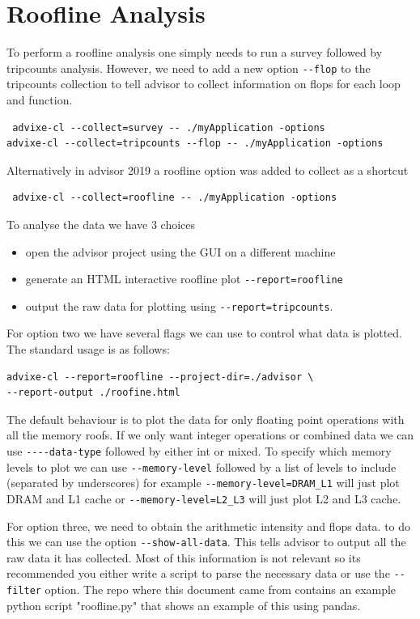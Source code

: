 \documentclass[a4paper, 11pt]{article}
\begin{document}
\section{Roofline Analysis}
To perform a roofline analysis one simply needs to run a survey followed by tripcounts analysis. However, we need to add a new option \verb+--flop+ to the tripcounts collection to tell advisor to collect information on flops for each loop and function.
 \begin{verbatim}
 advixe-cl --collect=survey -- ./myApplication -options
advixe-cl --collect=tripcounts --flop -- ./myApplication -options
\end{verbatim}

Alternatively in advisor 2019 a roofline option was added to collect as a shortcut
 \begin{verbatim}
 advixe-cl --collect=roofline -- ./myApplication -options
\end{verbatim}

To analyse the data we have 3 choices
\begin{itemize}
\item open the advisor project using the GUI on a different machine
\item generate an HTML interactive roofline plot \verb+--report=roofline+
\item output the raw data for plotting using \verb+--report=tripcounts+.
\end{itemize}

For option two we have several flags we can use to control what data is plotted. The standard usage is as follows:
\begin{verbatim}
advixe-cl --report=roofline --project-dir=./advisor \
--report-output ./roofine.html
\end{verbatim}

The default behaviour is to plot the data for only floating point operations with all the memory roofs. If we only want integer operations or combined data we can use \verb+----data-type+ followed by either int or mixed. To specify which memory levels to plot we can use \verb+--memory-level+ followed by a list of levels to include (separated by underscores) for example \verb+--memory-level=DRAM_L1+ will just plot DRAM and L1 cache or \verb+--memory-level=L2_L3+ will just plot L2 and L3 cache.
 

For option three, we need to obtain the arithmetic intensity and flops data. to do this we can use the option \verb+--show-all-data+. This tells advisor to output all the raw data it has collected. Most of this information is not relevant so its recommended you either write a script  to parse the necessary data or use the \verb+--filter+ option. The repo where this document came from contains an example python script "roofline.py" that shows an example of this using pandas.
\end{document}
